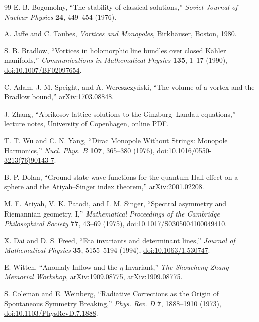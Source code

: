 \documentclass[aps,prd,reprint,nofootinbib,superscriptaddress,floatfix]{revtex4-2}
\numberwithin{equation}{section}
\theoremstyle{definition}
\theoremstyle{plain}
\begin{document}
\begin{thebibliography}{99}
E. B. Bogomolny,
``The stability of classical solutions,''
\emph{Soviet Journal of Nuclear Physics} \textbf{24}, 449--454 (1976).

A. Jaffe and C. Taubes,
\emph{Vortices and Monopoles},
Birkhäuser, Boston, 1980.

S. B. Bradlow,
``Vortices in holomorphic line bundles over closed Kähler manifolds,''
\emph{Communications in Mathematical Physics} \textbf{135}, 1--17 (1990),
\href{https://doi.org/10.1007/BF02097654}{doi:10.1007/BF02097654}.

C. Adam, J. M. Speight, and A. Wereszczyński,
``The volume of a vortex and the Bradlow bound,''
\href{https://arxiv.org/abs/1703.08848}{arXiv:1703.08848}.

J. Zhang,
``Abrikosov lattice solutions to the Ginzburg--Landau equations,''
lecture notes, University of Copenhagen,
\href{https://jingxuan.sites.ku.dk/files/2020/06/abrikosov.pdf}{online PDF}.


T. T. Wu and C. N. Yang,
``Dirac Monopole Without Strings: Monopole Harmonics,''
\emph{Nucl. Phys. B} \textbf{107}, 365--380 (1976),
\href{https://doi.org/10.1016/0550-3213(76)90143-7}{doi:10.1016/0550-3213(76)90143-7}.

B. P. Dolan,
``Ground state wave functions for the quantum Hall effect on a sphere and
the Atiyah--Singer index theorem,''
\href{https://arxiv.org/abs/2001.02208}{arXiv:2001.02208}.

M. F. Atiyah, V. K. Patodi, and I. M. Singer,
``Spectral asymmetry and Riemannian geometry. I,''
\emph{Mathematical Proceedings of the Cambridge Philosophical Society}
\textbf{77}, 43--69 (1975),
\href{https://doi.org/10.1017/S0305004100049410}{doi:10.1017/S0305004100049410}.

X. Dai and D. S. Freed,
``Eta invariants and determinant lines,''
\emph{Journal of Mathematical Physics} \textbf{35}, 5155--5194 (1994),
\href{https://doi.org/10.1063/1.530747}{doi:10.1063/1.530747}.

E. Witten,
``Anomaly Inflow and the \(\eta\)-Invariant,''
\emph{The Shoucheng Zhang Memorial Workshop}, arXiv:1909.08775,
\href{https://arxiv.org/abs/1909.08775}{arXiv:1909.08775}.



S. Coleman and E. Weinberg,
``Radiative Corrections as the Origin of Spontaneous Symmetry Breaking,''
\emph{Phys. Rev. D} \textbf{7}, 1888--1910 (1973),
\href{https://doi.org/10.1103/PhysRevD.7.1888}{doi:10.1103/PhysRevD.7.1888}.



\end{thebibliography}
\end{document}
